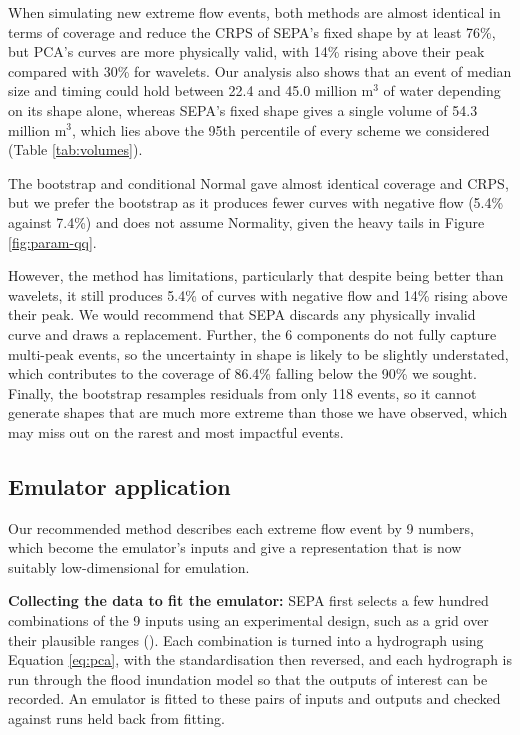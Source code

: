 \documentclass[
  11pt,
  a4paper]{article}
\begin{document}
When simulating new extreme flow events, both methods are almost identical in terms of coverage and reduce the CRPS of SEPA's fixed shape by at least 76\%, but PCA's curves are more physically valid, with 14\% rising above their peak compared with 30\% for wavelets. Our analysis also shows that an event of median size and timing could hold between 22.4 and 45.0 million \(\text{m}^3\) of water depending on its shape alone, whereas SEPA's fixed shape gives a single volume of 54.3 million \(\text{m}^3\), which lies above the 95th percentile of every scheme we considered (Table \ref{tab:volumes}).

The bootstrap and conditional Normal gave almost identical coverage and CRPS, but we prefer the bootstrap as it produces fewer curves with negative flow (5.4\% against 7.4\%) and does not assume Normality, given the heavy tails in Figure \ref{fig:param-qq}.

However, the method has limitations, particularly that despite being better than wavelets, it still produces 5.4\% of curves with negative flow and 14\% rising above their peak. We would recommend that SEPA discards any physically invalid curve and draws a replacement. Further, the 6 components do not fully capture multi-peak events, so the uncertainty in shape is likely to be slightly understated, which contributes to the coverage of 86.4\% falling below the 90\% we sought. Finally, the bootstrap resamples residuals from only 118 events, so it cannot generate shapes that are much more extreme than those we have observed, which may miss out on the rarest and most impactful events.

\subsection{Emulator application}\label{emulator}

Our recommended method describes each extreme flow event by 9 numbers, which become the emulator's inputs and give a representation that is now suitably low-dimensional for emulation.

\textbf{Collecting the data to fit the emulator:} SEPA first selects a few hundred combinations of the 9 inputs using an experimental design, such as a grid over their plausible ranges (). Each combination is turned into a hydrograph using Equation \eqref{eq:pca}, with the standardisation then reversed, and each hydrograph is run through the flood inundation model so that the outputs of interest can be recorded. An emulator is fitted to these pairs of inputs and outputs and checked against runs held back from fitting.
\end{document}
